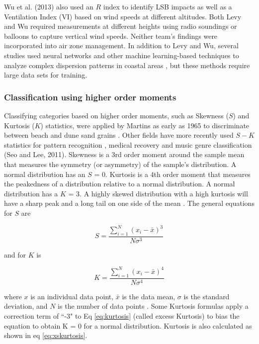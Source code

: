 Wu et al. (2013) also used an $R$ index to identify LSB impacts as well as a Ventilation Index (VI) based on wind speeds at different altitudes.  Both Levy and Wu required measurements at different heights using radio soundings or balloons to capture vertical wind speeds.  Neither team’s findings were incorporated into air zone management.  In addition to Levy and Wu, several studies used neural networks and other machine learning-based techniques to analyze complex dispersion patterns in coastal areas \citep{Elangasinghe2014, Feng2015}, but these methods require large data sets for training. 

\subsubsection{Classification using higher order moments}
Classifying categories based on higher order moments, such as Skewness ($S$) and Kurtosis ($K$) statistics, were applied by Martins as early as 1965 to discriminate between beach and dune sand grains \citep{Martins1965}.  Other fields have more recently used $S-K$ statistics for pattern recognition \citep{Crosilla2013}, medical recovery \citep{Chi2008} and music genre classification (Seo and Lee, 2011).  Skewness is a 3rd order moment around the sample mean that measures the symmetry (or asymmetry) of the sample’s distribution. A normal distribution has an $S$ = 0. Kurtosis is a 4th order moment that measures the peakedness of a distribution relative to a normal distribution. A normal distribution has a $K$ = 3. A highly skewed distribution with a high kurtosis will have a sharp peak and a long tail on one side of the mean \citep{NIST2013}.  The general equations for $S$ are

\begin{equation}
\label{eq:skewness}
S = \frac{\sum_{i=1}^{N}\left (x_{i}-\bar{x} \right )^{3}}{N\sigma^{3}}
\end{equation}

\noindent
and for $K$ is 

\begin{equation}
\label{eq:kurtosis}
K = \frac{\sum_{i=1}^{N}\left (x_{i}-\bar{x} \right )^{4}}{N\sigma^{4}}
\end{equation}

\noindent
where $x$ is an individual data point, $\bar{x}$ is the data mean, $\sigma$ is the standard deviation, and $N$ is the number of data points \citep{Cristelli2012}.    Some Kurtosis formulas apply a correction term of ``-3" to Eq \ref{eq:kurtosis} (called excess Kurtosis) to bias the equation to obtain K = 0 for a normal distribution.  Kurtosis is also calculated as shown in eq \ref{eq:xskurtosis}.

